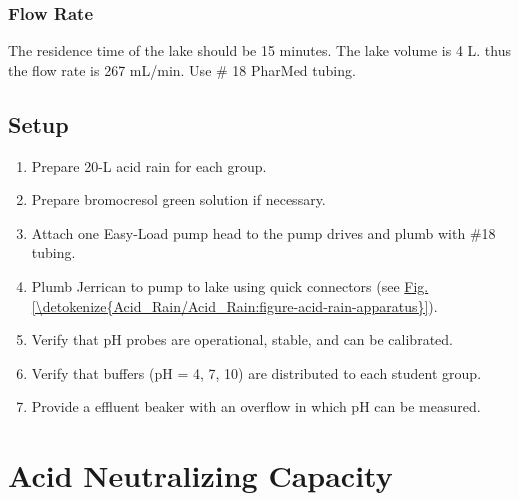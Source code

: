 \documentclass[letterpaper,10pt,english]{sphinxmanual}
\begin{document}
\subsection{Flow Rate}
\label{\detokenize{Acid_Rain/Acid_Rain:flow-rate}}
The residence time of the lake should be 15 minutes. The lake volume is 4 L. thus the flow rate is 267 mL/min. Use \# 18 PharMed tubing.


\section{Setup}
\label{\detokenize{Acid_Rain/Acid_Rain:setup}}\label{\detokenize{Acid_Rain/Acid_Rain:heading-acid-rain-setup}}\begin{enumerate}
\item {} 
Prepare 20-L acid rain for each group.

\item {} 
Prepare bromocresol green solution if necessary.

\item {} 
Attach one Easy-Load pump head to the pump drives and plumb with \#18 tubing.

\item {} 
Plumb Jerrican to pump to lake using quick connectors (see \hyperref[\detokenize{Acid_Rain/Acid_Rain:figure-acid-rain-apparatus}]{Fig.\@ \ref{\detokenize{Acid_Rain/Acid_Rain:figure-acid-rain-apparatus}}}).

\item {} 
Verify that pH probes are operational, stable, and can be calibrated.

\item {} 
Verify that buffers (pH = 4, 7, 10) are distributed to each student group.

\item {} 
Provide a effluent beaker with an overflow in which pH can be measured.

\end{enumerate}


\chapter{Acid Neutralizing Capacity}
\label{\detokenize{Acid_Neutralizing_Capacity/Acid_Neutralizing_Capacity:acid-neutralizing-capacity}}\label{\detokenize{Acid_Neutralizing_Capacity/Acid_Neutralizing_Capacity:title-acid-neutralizing-capacity}}\label{\detokenize{Acid_Neutralizing_Capacity/Acid_Neutralizing_Capacity::doc}}
\end{document}
